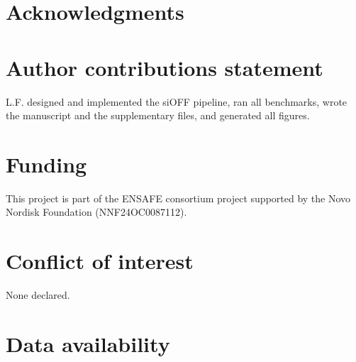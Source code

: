 \section{Acknowledgments}

\section{Author contributions statement}
L.F. designed and implemented the siOFF pipeline, ran 
all benchmarks, wrote the manuscript and the supplementary files, and generated all figures.

\section{Funding}
This project is part of the ENSAFE consortium project supported by the Novo Nordisk Foundation (NNF24OC0087112).

\section{Conflict of interest}
None declared.

\section{Data availability}
